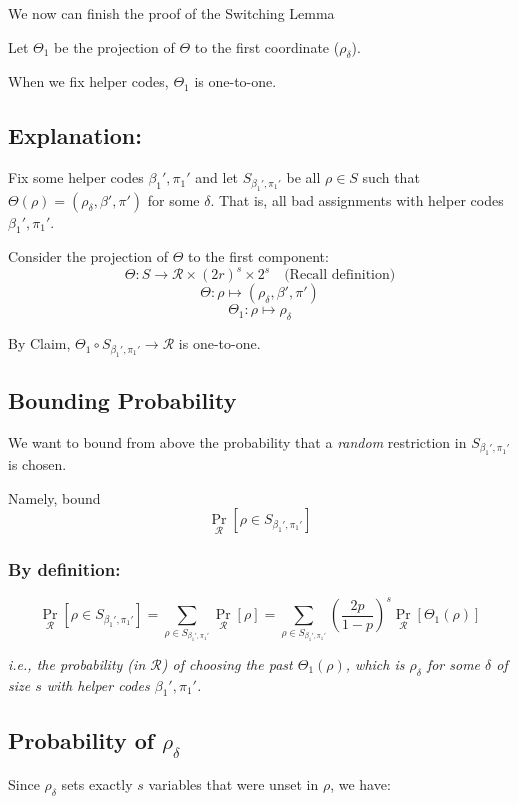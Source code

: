 We now can finish the proof of the Switching Lemma


Let \( \Theta_1 \) be the projection of \( \Theta \) to the first coordinate (\(\rho_{\delta}\)).

\begin{center}
   When we fix helper codes, \( \Theta_1 \) is one-to-one.
\end{center}

\subsection*{Explanation:}
Fix some helper codes \( \beta_1', \pi_1' \) and let \( S_{\beta_1', \pi_1'} \) be all \( \rho \in S \) such that \( \Theta(\rho) = (\rho_{\delta}, \beta', \pi') \) for some \( \delta \). That is, all bad assignments with helper codes \( \beta_1', \pi_1' \).

Consider the projection of \( \Theta \) to the first component:
\[
\Theta: S \to \mathcal{R} \times (2r)^s \times 2^s \quad \text{(Recall definition)}
\]
\[
\Theta: \rho \mapsto (\rho_{\delta}, \beta', \pi')
\]
\[
\Theta_1: \rho \mapsto \rho_{\delta}
\]

By Claim, \( \Theta_1 \circ S_{\beta_1',\pi_1'} \to \mathcal{R} \) is one-to-one.

\subsection*{Bounding Probability}
We want to bound from above the probability that a \textit{random} restriction in \( S_{\beta_1', \pi_1'} \) is chosen.

Namely, bound
\[
\Pr_{\mathcal{R}} [\rho \in S_{\beta_1', \pi_1'}]
\]

\subsubsection*{By definition:}
\[
\Pr_{\mathcal{R}} [\rho \in S_{\beta_1', \pi_1'}] = \sum_{\rho \in S_{\beta_1', \pi_1'}} \Pr_{\mathcal{R}} [\rho] = \sum_{\rho \in S_{\beta_1', \pi_1'}} \left( \frac{2p}{1-p} \right)^s \Pr_{\mathcal{R}} [\Theta_1(\rho)]
\]

\textit{i.e., the probability (in \( \mathcal{R} \)) of choosing the past \( \Theta_1(\rho) \), which is \( \rho_{\delta} \) for some \( \delta \) of size \( s \) with helper codes \( \beta_1', \pi_1' \).}

\subsection*{Probability of \( \rho_{\delta} \)}
Since \( \rho_{\delta} \) sets exactly \( s \) variables that were unset in \( \rho \), we have:

